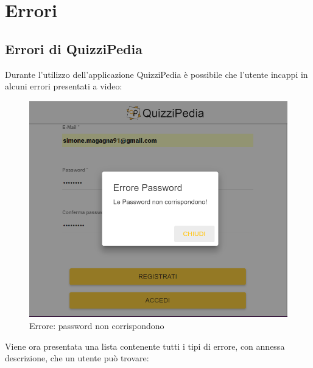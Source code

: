 \newpage
\section{Errori}

\subsection{Errori di QuizziPedia}
Durante l'utilizzo dell'applicazione QuizziPedia è possibile che l'utente incappi in alcuni errori presentati a video:

\label{Errore}
\begin{figure}[ht]
	\centering
	\includegraphics[scale=0.45]{img/errore.png}
	\caption{Errore: password non corrispondono}
\end{figure}
\FloatBarrier 

Viene ora presentata una lista contenente tutti i tipi di errore, con annessa descrizione, che un utente può trovare:

